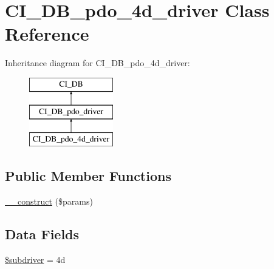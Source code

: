 \hypertarget{class_c_i___d_b__pdo__4d__driver}{}\section{C\+I\+\_\+\+D\+B\+\_\+pdo\+\_\+4d\+\_\+driver Class Reference}
\label{class_c_i___d_b__pdo__4d__driver}
Inheritance diagram for C\+I\+\_\+\+D\+B\+\_\+pdo\+\_\+4d\+\_\+driver\+:\begin{figure}[H]
\begin{center}
\leavevmode
\includegraphics[height=3.000000cm]{class_c_i___d_b__pdo__4d__driver}
\end{center}
\end{figure}
\subsection*{Public Member Functions}
\begin{DoxyCompactItemize}
\item 
\mbox{\hyperlink{class_c_i___d_b__pdo__4d__driver_a9162320adff1a1a4afd7f2372f753a3e}{\+\_\+\+\_\+construct}} (\$params)
\end{DoxyCompactItemize}
\subsection*{Data Fields}
\begin{DoxyCompactItemize}
\item 
\mbox{\hyperlink{class_c_i___d_b__pdo__4d__driver_a1322ca756348b11d080cb7a4f590de15}{\$subdriver}} = \textquotesingle{}4d\textquotesingle{}
\end{DoxyCompactItemize}
